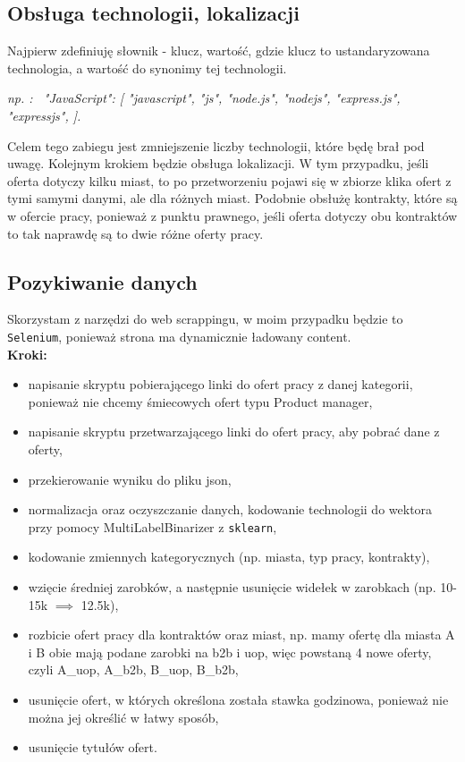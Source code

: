 \documentclass[a4paper]{article}
\begin{document}
\subsection{Obsługa technologii, lokalizacji}

\quad Najpierw zdefiniuję słownik - klucz, wartość, gdzie klucz to ustandaryzowana technologia, a wartość do synonimy tej technologii.

\textit{np. : \ "JavaScript": [
"javascript",
"js",
"node.js",
"nodejs",
"express.js",
"expressjs",
].}

\quad Celem tego zabiegu jest zmniejszenie liczby technologii, które będę brał pod uwagę. Kolejnym
krokiem będzie obsługa lokalizacji. W tym przypadku, jeśli oferta dotyczy kilku miast, to po przetworzeniu pojawi się w zbiorze
klika ofert z tymi samymi danymi, ale dla różnych miast. Podobnie obsłużę kontrakty, które są w ofercie pracy, ponieważ z punktu
prawnego, jeśli oferta dotyczy obu kontraktów to tak naprawdę są to dwie różne oferty pracy.


\subsection{Pozykiwanie danych}

\quad Skorzystam z narzędzi do web scrappingu, w moim przypadku będzie
to \texttt{Selenium}, ponieważ strona ma dynamicznie ładowany content.\\


\textbf{Kroki:}

\begin{itemize}
    \item napisanie skryptu pobierającego linki do ofert pracy z danej kategorii, ponieważ nie chcemy śmiecowych ofert typu Product manager,
    \item napisanie skryptu przetwarzającego linki do ofert pracy, aby pobrać dane z oferty,
    \item przekierowanie wyniku do pliku json,
    \item normalizacja oraz oczyszczanie danych, kodowanie technologii do wektora przy pomocy MultiLabelBinarizer z \texttt{sklearn},
    \item kodowanie zmiennych kategorycznych (np. miasta, typ pracy, kontrakty),
    \item wzięcie średniej zarobków, a następnie usunięcie widełek w zarobkach (np. 10-15k $\implies$ 12.5k),
    \item rozbicie ofert pracy dla kontraktów oraz miast, np. mamy ofertę dla miasta A i B obie mają podane
          zarobki na b2b i uop, więc powstaną 4 nowe oferty, czyli A\_uop, A\_b2b, B\_uop, B\_b2b,
    \item usunięcie ofert, w których określona została stawka godzinowa, ponieważ nie można jej określić w łatwy sposób,
    \item usunięcie tytułów ofert.
\end{itemize}
\end{document}
